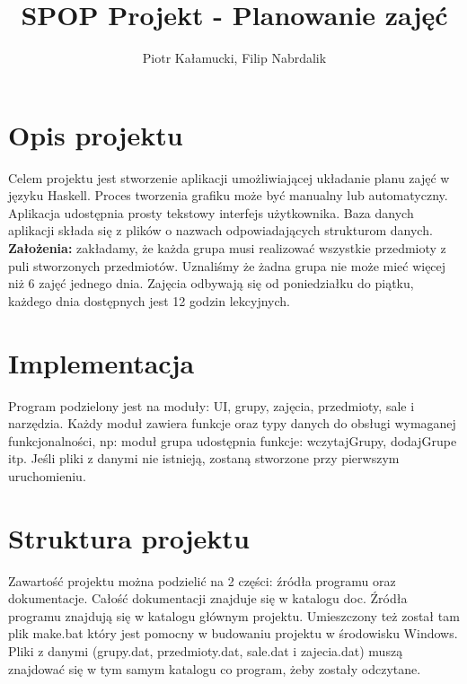 \documentclass[12pt,a4paper]{article}
\author{Piotr Kałamucki, Filip Nabrdalik}
\title{SPOP Projekt - Planowanie zajęć}
\begin{document}
\maketitle
\thispagestyle{empty}
\pagestyle{empty}
\section{Opis projektu}
Celem projektu jest stworzenie aplikacji umożliwiającej układanie planu zajęć w języku Haskell. Proces tworzenia grafiku może być manualny lub automatyczny. Aplikacja udostępnia prosty tekstowy interfejs użytkownika. Baza danych aplikacji składa się z plików o nazwach odpowiadających strukturom danych.
\textbf{Założenia:} zakładamy, że każda grupa musi realizować wszystkie przedmioty z puli stworzonych przedmiotów. Uznaliśmy że żadna grupa nie może mieć więcej niż 6 zajęć jednego dnia. Zajęcia odbywają się od poniedziałku do piątku, każdego dnia dostępnych jest 12 godzin lekcyjnych.
\section{Implementacja}
Program podzielony jest na moduły: UI, grupy, zajęcia, przedmioty, sale i narzędzia. Każdy moduł zawiera funkcje oraz typy danych do obsługi wymaganej funkcjonalności, np: moduł grupa udostępnia funkcje: wczytajGrupy, dodajGrupe itp. Jeśli pliki z danymi nie istnieją, zostaną stworzone przy pierwszym uruchomieniu.
\section{Struktura projektu}
Zawartość projektu można podzielić na 2 części: źródła programu oraz dokumentacje. Całość dokumentacji znajduje się w katalogu doc. Źródła programu znajdują się w katalogu głównym projektu. Umieszczony też został tam plik make.bat który jest pomocny w budowaniu projektu w środowisku Windows. Pliki z danymi (grupy.dat, przedmioty.dat, sale.dat i zajecia.dat) muszą znajdować się w tym samym katalogu co program, żeby zostały odczytane.
\end{document}
